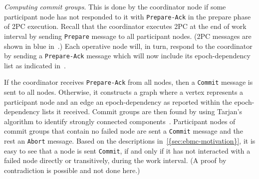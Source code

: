 \textit{Computing commit groups}. This is done by the coordinator node if some participant node has not responded to it with \texttt{Prepare-Ack} in the prepare phase of 2PC execution. Recall that the coordinator executes 2PC at the end of work interval by sending \texttt{Prepare} message to all participant nodes. (2PC messages are shown in blue in~.) Each operative node will, in turn, respond to the coordinator by sending a \texttt{Prepare-Ack} message which will now include its epoch-dependency list as indicated in~.

If the coordinator receives \texttt{Prepare-Ack} from all nodes, then a \texttt{Commit} message is sent to all nodes. Otherwise, it constructs a graph where a vertex represents a participant node and an edge an epoch-dependency as reported within the epoch-dependency lists it received.
Commit groups are then found by using Tarjan’s algorithm to identify strongly
connected components~\cite{tarjan}. Participant nodes of commit groups that contain no failed node are sent a \texttt{Commit} message and the rest an \texttt{Abort} message. 
 Based on the descriptions in~\cref{{sec:ebmc-motivation}}, it is easy to see that a node is sent \texttt{Commit}, if and only if it has not interacted with a failed node directly or transitively, during the work interval. (A proof by contradiction is possible and not done here.)



